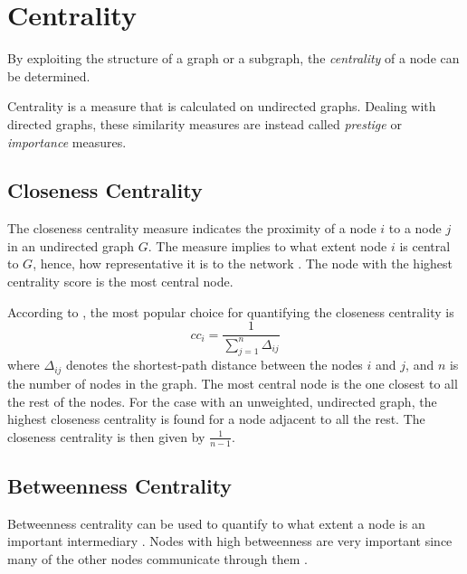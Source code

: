 \section{Centrality}
By exploiting the structure of a graph or a subgraph, the \textit{centrality} of a node can be determined. 

Centrality is a measure that is calculated on undirected graphs. Dealing with directed graphs, these similarity measures are instead called \textit{prestige} or \textit{importance} measures. \cite{fouss2016algorithms}


\subsection{Closeness Centrality}
The closeness centrality measure indicates the proximity of a node $i$ to a node $j$ in an undirected graph $G$. The measure implies to what extent node $i$ is central to $G$, hence, how representative it is to the network \citep{fouss2016algorithms}. The node with the highest centrality score is the most central node.

According to \citet{fouss2016algorithms}, the most popular choice for quantifying the closeness centrality is
\begin{equation}
    cc_i=\frac{1}{\sum_{j=1}^{n} \Delta_{ij}}
\end{equation}
where $\Delta_{ij}$ denotes the shortest-path distance between the nodes $i$ and $j$, and $n$ is the number of nodes in the graph. The most central node is the one closest to all the rest of the nodes. For the case with an unweighted, undirected graph, the highest closeness centrality is found for a node adjacent to all the rest. The closeness centrality is then given by $\frac{1}{n-1}$.

\subsection{Betweenness Centrality}
Betweenness centrality can be used to quantify to what extent a node is an important intermediary \citep{fouss2016algorithms}. Nodes with high betweenness are very important since many of the other nodes communicate through them \citep{Kajdanowicz2013}. 

